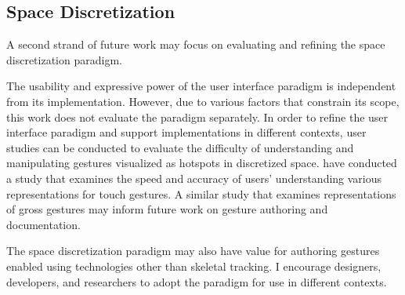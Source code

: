 \subsection{Space Discretization}

A second strand of future work may focus on evaluating and refining the space discretization paradigm.

The usability and expressive power of the user interface paradigm is independent from its implementation. However, due to various factors that constrain its scope, this work does not evaluate the paradigm separately. In order to refine the user interface paradigm and support implementations in different contexts, user studies can be conducted to evaluate the difficulty of understanding and manipulating gestures visualized as hotspots in discretized space. \textcite{Kin:2012} have conducted a study that examines the speed and accuracy of users' understanding various representations for touch gestures. A similar study that examines representations of gross gestures may inform future work on gesture authoring and documentation.

The space discretization paradigm may also have value for authoring gestures enabled using technologies other than skeletal tracking. I encourage designers, developers, and researchers to adopt the paradigm for use in different contexts.
